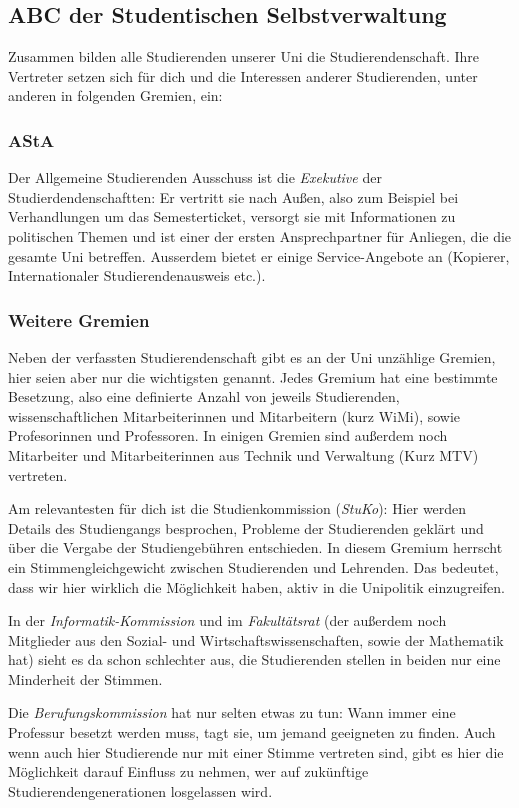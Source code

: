 	\subsection{ABC der Studentischen Selbstverwaltung}
	Zusammen bilden alle Studierenden unserer Uni die Studierendenschaft. Ihre Vertreter setzen sich für dich und die
	Interessen anderer Studierenden, unter anderen in folgenden
	Gremien, ein:

	\subsubsection*{AStA}
		Der Allgemeine Studierenden Ausschuss ist die
		\emph{Exekutive} der Studierdendenschaftten: Er vertritt
		sie nach Außen, also zum Beispiel bei Verhandlungen um
		das Semesterticket, versorgt sie mit Informationen zu
		politischen Themen  und ist einer der ersten
		Ansprechpartner für  Anliegen, die die gesamte Uni
		betreffen. Ausserdem bietet er einige Service-Angebote
		an (Kopierer, Internationaler Studierendenausweis etc.).

		\subsubsection*{Weitere Gremien}
		Neben der verfassten Studierendenschaft gibt es an der Uni  unzählige Gremien, hier seien aber nur die wichtigsten genannt. Jedes Gremium hat eine bestimmte Besetzung, also eine definierte Anzahl von jeweils Studierenden, wissenschaftlichen Mitarbeiterinnen und  Mitarbeitern (kurz WiMi), sowie Profesorinnen  und Professoren. In einigen Gremien sind außerdem noch Mitarbeiter und Mitarbeiterinnen aus Technik und Verwaltung (Kurz MTV) vertreten.

		Am relevantesten für dich ist die Studienkommission (\emph{StuKo}): Hier werden Details des Studiengangs besprochen, Probleme der Studierenden geklärt und über die Vergabe der Studiengebühren entschieden. In diesem Gremium herrscht ein Stimmengleichgewicht zwischen Studierenden und Lehrenden. Das bedeutet, dass wir hier wirklich die Möglichkeit haben, aktiv in die Unipolitik einzugreifen.

		In der \emph{Informatik-Kommission} und im
		\emph{Fakultätsrat} (der außerdem noch Mitglieder aus
		den Sozial- und Wirtschaftswissenschaften, sowie der Mathematik hat) sieht es da schon schlechter aus, die Studierenden stellen in beiden nur eine Minderheit der Stimmen.

		Die \emph{Berufungskommission} hat nur selten etwas zu tun: Wann immer eine Professur besetzt werden muss, tagt sie, um jemand geeigneten zu finden. Auch wenn auch hier Studierende nur mit einer Stimme vertreten sind, gibt es hier die Möglichkeit darauf Einfluss zu nehmen, wer auf zukünftige Studierendengenerationen losgelassen wird.


